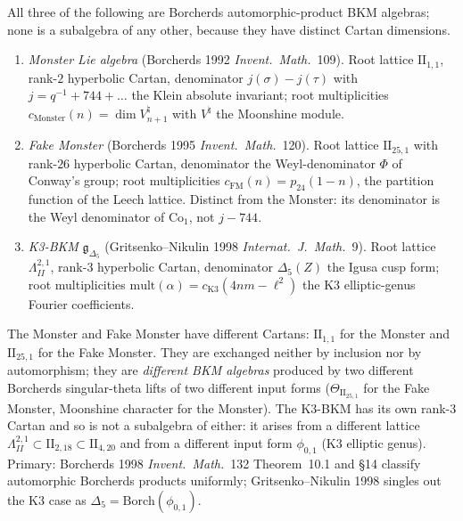 \begin{remark}
\label{rem:k3ca-monster-fake-monster-k3-bkm}
All three of the following are Borcherds automorphic-product BKM
algebras; none is a subalgebra of any other, because they have
distinct Cartan dimensions.
\begin{enumerate}[label=\textup{(\arabic*)}]
\item \emph{Monster Lie algebra} (Borcherds 1992
 \emph{Invent.\ Math.}~109). Root lattice $\mathrm{II}_{1,1}$,
 rank-$2$ hyperbolic Cartan, denominator $j(\sigma)-j(\tau)$ with
 $j = q^{-1} + 744 + \ldots$ the Klein absolute invariant;
 root multiplicities $c_{\mathrm{Monster}}(n) = \dim V^\natural_{n+1}$
 with $V^\natural$ the Moonshine module.
\item \emph{Fake Monster} (Borcherds 1995
 \emph{Invent.\ Math.}~120). Root lattice $\mathrm{II}_{25,1}$
 with rank-$26$ hyperbolic Cartan, denominator the Weyl-denominator
 $\Phi$ of Conway's group; root multiplicities
 $c_{\mathrm{FM}}(n) = p_{24}(1-n)$, the partition function of
 the Leech lattice. Distinct from the Monster: its denominator is
 the Weyl denominator of $\mathrm{Co}_1$, not $j-744$.
\item \emph{K3-BKM} $\mathfrak g_{\Delta_5}$ (Gritsenko--Nikulin 1998
 \emph{Internat.\ J.\ Math.}~9). Root lattice $\Lambda^{2,1}_{II}$,
 rank-$3$ hyperbolic Cartan, denominator $\Delta_5(Z)$ the
 Igusa cusp form; root multiplicities
 $\mathrm{mult}(\alpha) = c_{\mathrm{K3}}(4nm-\ell^2)$ the K3
 elliptic-genus Fourier coefficients.
\end{enumerate}
The Monster and Fake Monster have different Cartans:
$\mathrm{II}_{1,1}$ for the Monster and $\mathrm{II}_{25,1}$ for
the Fake Monster. They are exchanged neither by inclusion nor by
automorphism; they are \emph{different BKM algebras} produced by
two different Borcherds singular-theta lifts of two different
input forms ($\Theta_{\mathrm{II}_{25,1}}$ for the Fake Monster,
Moonshine character for the Monster). The K3-BKM has its own
rank-$3$ Cartan and so is not a subalgebra of either: it arises
from a different lattice
$\Lambda^{2,1}_{II}\subset\mathrm{II}_{2,18}\subset\mathrm{II}_{4,20}$
and from a different input form $\phi_{0,1}$ (K3 elliptic genus).
Primary: Borcherds 1998 \emph{Invent.\ Math.}~132 Theorem~10.1 and
\S14 classify automorphic Borcherds products uniformly;
Gritsenko--Nikulin 1998 singles out the K3 case as
$\Delta_5 = \mathrm{Borch}(\phi_{0,1})$.
\end{remark}

